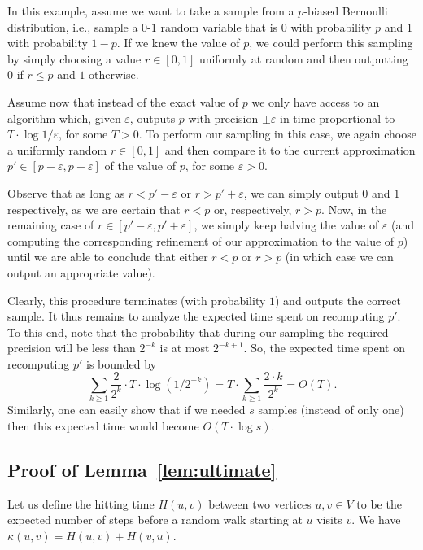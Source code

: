 \documentclass[11pt, letterpaper]{article}
\begin{document}
In this example, assume we want to take a sample from a $p$-biased Bernoulli distribution, i.e., sample a $0$-$1$ random variable that is $0$ with probability $p$ and $1$ with probability $1-p$. If we knew the value of $p$, we could perform this sampling by simply choosing a value $r\in [0,1]$ uniformly at random and then outputting $0$ if $r\leq p$ and $1$ otherwise.

Assume now that instead of the exact value of $p$ we only have access to an algorithm which, given $\varepsilon$, outputs $p$ with precision $\pm \varepsilon$ in time proportional to $T\cdot \log 1/\varepsilon$, for some $T>0$. To perform our sampling in this case, we again choose a uniformly random $r\in [0,1]$ and then compare it to the current approximation $p'\in [p-\varepsilon,p+\varepsilon]$ of the value of $p$, for some $\varepsilon>0$. 

Observe that as long as $r<p'-\varepsilon$ or $r>p'+\varepsilon$, we can simply output $0$ and $1$ respectively, as we are certain that $r<p$ or, respectively, $r>p$. Now, in the remaining case of $r\in [p'-\varepsilon, p'+\varepsilon]$, we simply keep halving the value of $\varepsilon$ (and computing the corresponding refinement of our approximation to the value of $p$) until we are able to conclude that either $r< p$ or $r>p$ (in which case we can output an appropriate value).

Clearly, this procedure terminates (with probability $1$) and outputs the correct sample. It thus remains to analyze the expected time spent on recomputing $p'$. To this end, note that the probability that during our sampling the required precision will be less than $2^{-k}$ is at most $2^{-k+1}$. So, the expected time spent on recomputing $p'$ is bounded by
\[
\sum_{k\ge 1} \frac{2}{2^k} \cdot T\cdot \log (1/2^{-k})=T \cdot \sum_{k\ge 1} \frac{2\cdot k}{2^k}=O(T).
\]
Similarly, one can easily show that if we needed $s$ samples (instead of only one) then this expected time would become $O(T \cdot \log s)$.

\subsection{Proof of Lemma~\ref{lem:ultimate}} \label{app:proof_of_ultimate}

Let us define the hitting time $H(u,v)$ between two vertices $u, v \in V$ to be the expected number of steps before a random walk starting at $u$ visits $v$. We have $\kappa(u,v) = H(u,v) + H(v,u)$.
\end{document}
